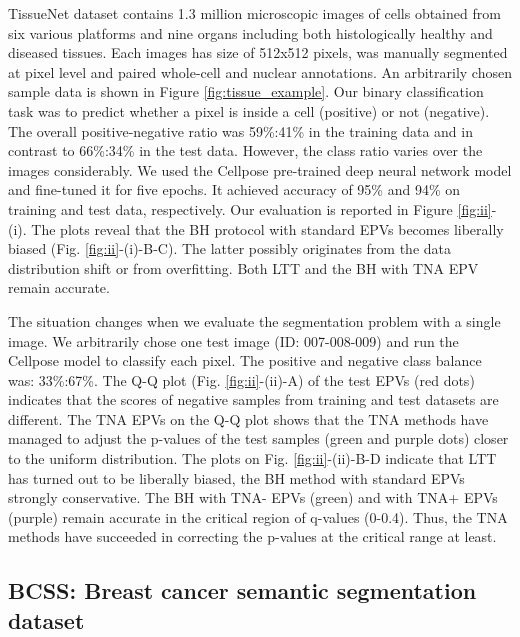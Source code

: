 \documentclass{article}
\begin{document}
TissueNet dataset contains 1.3 million microscopic images of cells obtained from six various platforms and nine organs including both histologically healthy and diseased tissues. Each images has size of 512x512 pixels, was manually segmented at pixel level and paired whole-cell and nuclear annotations.  An arbitrarily chosen sample data is shown in Figure \ref{fig:tissue_example}. Our binary classification task was to predict whether a pixel is inside a cell (positive) or not (negative). The overall positive-negative ratio was 59\%:41\% in the training data and in contrast to 66\%:34\% in the test data. However, the class ratio varies over the images considerably. We used the Cellpose pre-trained deep neural network model \cite{cellpose} and fine-tuned it for five epochs. It achieved accuracy of 95\% and 94\% on training and test data, respectively. Our evaluation is reported in Figure \ref{fig:ii}-(i). The plots reveal that the BH protocol with standard EPVs becomes liberally biased (Fig. \ref{fig:ii}-(i)-B-C). The latter possibly originates from the data distribution shift or from overfitting. Both LTT and the BH with TNA EPV remain accurate. 

The situation changes when we evaluate the segmentation problem with a single image. We arbitrarily chose one test image (ID: 007-008-009) and run the Cellpose model to classify each pixel. The positive and negative class balance was: 33\%:67\%. The Q-Q plot (Fig. \ref{fig:ii}-(ii)-A) of the test EPVs (red dots) indicates that the scores of negative samples from training and test datasets are different. The TNA EPVs on the Q-Q plot shows that the TNA methods have managed to adjust the p-values of the test samples (green and purple dots) closer to the uniform distribution. The plots on Fig. \ref{fig:ii}-(ii)-B-D indicate that LTT has turned out to be liberally biased, the BH method with standard EPVs strongly conservative. The BH with TNA- EPVs (green) and with TNA+ EPVs (purple) remain accurate in the critical region of q-values (0-0.4). Thus, the TNA methods have succeeded in correcting the p-values at the critical range at least. 






\subsection{BCSS: Breast cancer semantic segmentation dataset}
\end{document}
